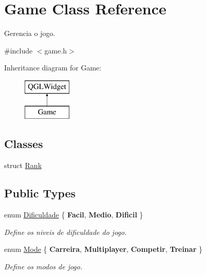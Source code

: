 \hypertarget{class_game}{}\section{Game Class Reference}
\label{class_game}


Gerencia o jogo.  




{\ttfamily \#include $<$game.\+h$>$}

Inheritance diagram for Game\+:\begin{figure}[H]
\begin{center}
\leavevmode
\includegraphics[height=2.000000cm]{class_game}
\end{center}
\end{figure}
\subsection*{Classes}
\begin{DoxyCompactItemize}
\item 
struct \hyperlink{struct_game_1_1_rank}{Rank}
\end{DoxyCompactItemize}
\subsection*{Public Types}
\begin{DoxyCompactItemize}
\item 
\hypertarget{class_game_aa9e701b2208301d5a5a67816ea54fe19}{}enum \hyperlink{class_game_aa9e701b2208301d5a5a67816ea54fe19}{Dificuldade} \{ {\bfseries Facil}, 
{\bfseries Medio}, 
{\bfseries Dificil}
 \}\label{class_game_aa9e701b2208301d5a5a67816ea54fe19}

\begin{DoxyCompactList}\small\item\em Define os niveis de dificuldade do jogo. \end{DoxyCompactList}\item 
\hypertarget{class_game_a78224b33425ca8e37cc762f8a181663e}{}enum \hyperlink{class_game_a78224b33425ca8e37cc762f8a181663e}{Mode} \{ {\bfseries Carreira}, 
{\bfseries Multiplayer}, 
{\bfseries Competir}, 
{\bfseries Treinar}
 \}\label{class_game_a78224b33425ca8e37cc762f8a181663e}

\begin{DoxyCompactList}\small\item\em Define os modos de jogo. \end{DoxyCompactList}\end{DoxyCompactItemize}
